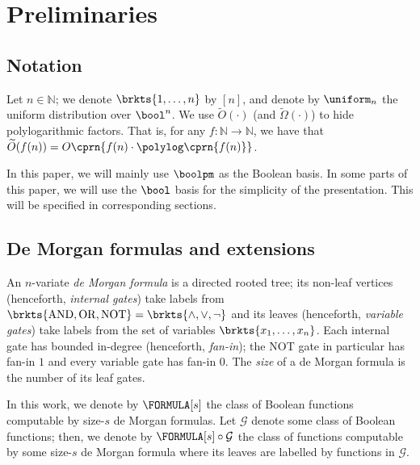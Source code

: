\setcounter{section}{1}
\setcounter{theorem}{7}
	\section{Preliminaries}\label{sec:preliminaries}
	
	\subsection{Notation}
	
	Let $n\in\mathbb{N}$; we denote $\brkts{1,\dots,n}$ by $[n]$, and denote by $\uniform_n$ the uniform distribution over $\bool^n$. We use $\widetilde{O}(\cdot)$ (and $\widetilde{\Omega}(\cdot)$)  to hide polylogarithmic factors. That is, for any $f\colon\mathbb{N}\to\mathbb{N}$, we have that $\widetilde{O}(f(n))=O\cprn{f(n)\cdot\polylog\cprn{f(n)}}$.
	
	In this paper, we will mainly use $\boolpm$ as the Boolean basis. In some parts of this paper, we will use the $\bool$ basis for the simplicity of the presentation. This will be specified in corresponding sections.
	
	\subsection{De Morgan formulas and extensions}
	
	\begin{definition}
	    An $n$-variate \emph{de Morgan formula} is a directed rooted tree; its non-leaf vertices (henceforth, \emph{internal gates}) take labels from $\brkts{{\rm AND},{\rm OR},{\rm NOT}}=\brkts{\land,\lor,\neg}$ and its leaves (henceforth, \emph{variable gates}) take labels from the set of variables $\brkts{x_1,\dots,x_n}$. Each internal gate has bounded in-degree (henceforth, \emph{fan-in}); the {\rm NOT} gate in particular has fan-in $1$ and every variable gate has fan-in $0$. The \emph{size} of a de Morgan formula is the number of its leaf gates.
%
	\end{definition}
	
	In this work, we denote by $\FORMULA[s]$ the class of Boolean functions computable by size-$s$ de Morgan formulas. Let $\mathcal{G}$ denote some class of Boolean functions; then, we denote by $\FORMULA[s]\circ\mathcal{G}$ the class of functions computable by some size-$s$ de Morgan formula where its leaves are labelled by functions in $\mathcal{G}$.
	
%
	
%
%
%
%
%
%
%
%
%
    
